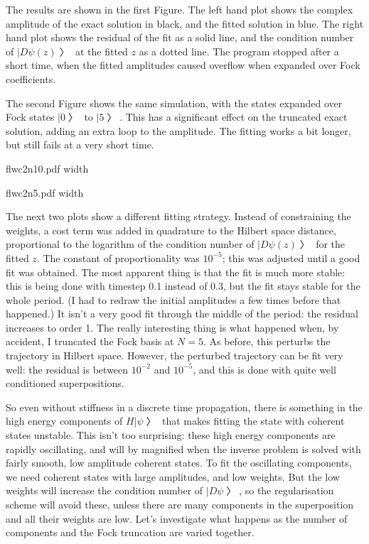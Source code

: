 The results are shown in the first Figure.  The left hand plot shows the complex amplitude of the exact solution in black, and the fitted solution in blue.  The right hand plot shows the residual of the fit as a solid line, and the condition number of $|Dψ(z)〉$ at the fitted $z$ as a dotted line.  The program stopped after a short time, when the fitted amplitudes caused overflow when expanded over Fock coefficients.  

The second Figure shows the same simulation, with the states expanded over Fock states $|0〉$ to $|5〉$.  This has a significant effect on the truncated exact solution, adding an extra loop to the amplitude.  The fitting works a bit longer, but still fails at a very short time.

\centerline{\XeTeXpicfile flwc2n10.pdf width \hsize}

\centerline{\XeTeXpicfile flwc2n5.pdf width \hsize}

The next two plots show a different fitting strategy.  Instead of constraining the weights, a cost term was added in quadrature to the Hilbert space distance, proportional to the logarithm of the condition number of $|Dψ(z)〉$ for the fitted $z$.  The constant of proportionality was $10^{-5}$; this was adjusted until a good fit was obtained.  The most apparent thing is that the fit is much more stable: this is being done with timestep 0.1 instead of 0.3, but the fit stays stable for the whole period.  (I had to redraw the initial amplitudes a few times before that happened.)  It isn't a very good fit through the middle of the period: the residual increases to order 1.  The really interesting thing is what happened when, by accident, I truncated the Fock basis at $N=5$.  As before, this perturbs the trajectory in Hilbert space.  However, the perturbed trajectory can be fit very well: the residual is between $10^{-2}$ and $10^{-5}$, and this is done with quite well conditioned superpositions.

So even without stiffness in a discrete time propagation, there is something in the high energy components of $H|ψ〉$ that makes fitting the state with coherent states unstable.  This isn't too surprising: these high energy components are rapidly oscillating, and will by magnified when the inverse problem is solved with fairly smooth, low amplitude coherent states.  To fit the oscillating components, we need coherent states with large amplitudes, and low weights.  But the low weights will increase the condition number of $|Dψ〉$, so the regularisation scheme will avoid these, unless there are many components in the superposition and all their weights are low.  Let's investigate what happens as the number of components and the Fock truncation are varied together.

